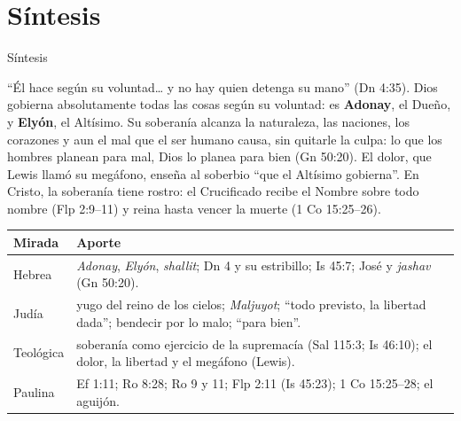 \documentclass[hyperref={bookmarks=false},aspectratio=169]{beamer}
\newcommand{\destacar}[1]{\textbf{\textcolor{azul}{#1}}}
\begin{document}
\section{Síntesis}

\begin{frame}{Síntesis}
\begin{tcolorbox}[colback=papiro,colframe=azul,boxrule=1pt,arc=3pt]
\small ``Él hace según su voluntad\ldots{} y no hay quien detenga su mano'' (Dn 4:35). Dios gobierna absolutamente todas las cosas según su voluntad: es \destacar{Adonay}, el Dueño, y \destacar{Elyón}, el Altísimo. Su soberanía alcanza la naturaleza, las naciones, los corazones y aun el mal que el ser humano causa, sin quitarle la culpa: lo que los hombres planean para mal, Dios lo planea para bien (Gn 50:20). El dolor, que Lewis llamó su megáfono, enseña al soberbio ``que el Altísimo gobierna''. En Cristo, la soberanía tiene rostro: el Crucificado recibe el Nombre sobre todo nombre (Flp 2:9--11) y reina hasta vencer la muerte (1 Co 15:25--26).
\end{tcolorbox}
\scriptsize\renewcommand{\arraystretch}{1.12}
\begin{tabular}{@{}>{\RaggedRight\arraybackslash}p{2.4cm}>{\RaggedRight\arraybackslash}p{9.4cm}@{}}
\toprule
\textbf{Mirada} & \textbf{Aporte} \\ \midrule
Hebrea & \emph{Adonay}, \emph{Elyón}, \emph{shallit}; Dn 4 y su estribillo; Is 45:7; José y \emph{jashav} (Gn 50:20). \\
Judía & yugo del reino de los cielos; \emph{Maljuyot}; ``todo previsto, la libertad dada''; bendecir por lo malo; ``para bien''. \\
Teológica & soberanía como ejercicio de la supremacía (Sal 115:3; Is 46:10); el dolor, la libertad y el megáfono (Lewis). \\
Paulina & Ef 1:11; Ro 8:28; Ro 9 y 11; Flp 2:11 (Is 45:23); 1 Co 15:25--28; el aguijón. \\
\bottomrule
\end{tabular}
\end{frame}
\end{document}

